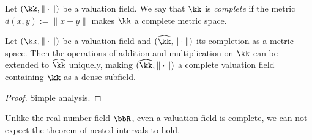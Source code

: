     \begin{definition}\label{def:complete_valuation_field}
        Let \((\kk,\|\cdot\|)\) be a valuation field.
        We say that \(\kk\) is \emph{complete} if the metric \(d(x,y) := \|x - y\|\) makes \(\kk\) a complete metric space.
    \end{definition}

    \begin{lemma}\label{lem:completion_of_valuation_field}
        Let \((\kk,\|\cdot\|)\) be a valuation field and \((\widehat{\kk},\|\cdot\|)\) its completion as a metric space.
        Then the operations of addition and multiplication on \(\kk\) can be extended to \(\widehat{\kk}\) uniquely, making \((\widehat{\kk},\|\cdot\|)\) a complete valuation field containing \(\kk\) as a dense subfield.
    \end{lemma}
    \begin{proof}
        Simple analysis.
    \end{proof}


    Unlike the real number field \(\bbR\), even a valuation field is complete, we can not expect the theorem of nested intervals to hold.

